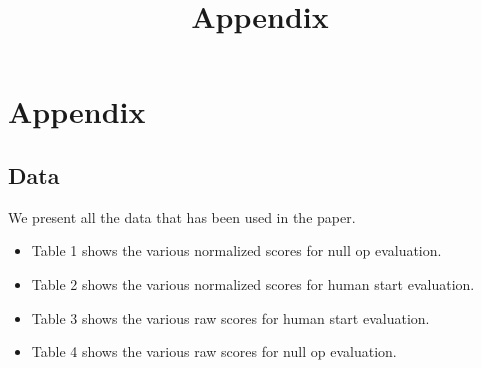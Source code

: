 \graphicspath{{figures/}}

	\title{Appendix}
	\maketitle

\section{Appendix}

\subsection{Data}
We present all the data that has been used in the paper. 
	\begin{itemize}
		\item Table 1 shows the various normalized scores for null op evaluation.
		\item Table 2 shows the various normalized scores for human start evaluation.
		\item Table 3 shows the various raw scores for human start evaluation.
		\item Table 4 shows the various raw scores for null op evaluation.
	\end{itemize}

